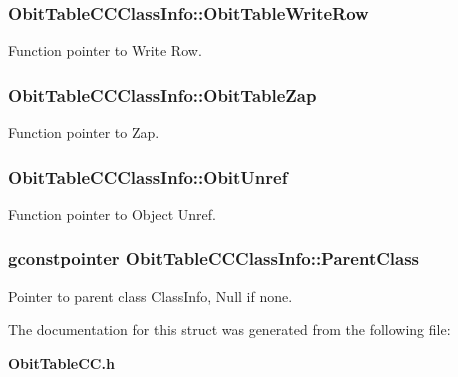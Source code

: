 \subsubsection{ {\bf Obit\-Table\-CCClass\-Info::Obit\-Table\-Write\-Row}}\label{structObitTableCCClassInfo_o26}


Function pointer to Write Row. 

\subsubsection{ {\bf Obit\-Table\-CCClass\-Info::Obit\-Table\-Zap}}\label{structObitTableCCClassInfo_o19}


Function pointer to Zap. 

\subsubsection{ {\bf Obit\-Table\-CCClass\-Info::Obit\-Unref}}\label{structObitTableCCClassInfo_o11}


Function pointer to Object Unref. 

\subsubsection{\setlength{\rightskip}{0pt plus 5cm}gconstpointer {\bf Obit\-Table\-CCClass\-Info::Parent\-Class}}\label{structObitTableCCClassInfo_o3}


Pointer to parent class Class\-Info, Null if none. 



The documentation for this struct was generated from the following file:\begin{CompactItemize}
\item 
{\bf Obit\-Table\-CC.h}\end{CompactItemize}
